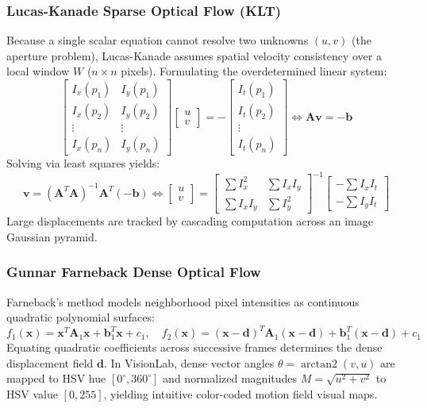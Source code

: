 \subsubsection{Lucas-Kanade Sparse Optical Flow (KLT)}
Because a single scalar equation cannot resolve two unknowns $(u,v)$ (the aperture problem), Lucas-Kanade assumes spatial velocity consistency over a local window $W$ ($n \times n$ pixels). Formulating the overdetermined linear system:
\begin{equation}
    \begin{bmatrix} I_x(p_1) & I_y(p_1) \\ I_x(p_2) & I_y(p_2) \\ \vdots & \vdots \\ I_x(p_n) & I_y(p_n) \end{bmatrix} \begin{bmatrix} u \\ v \end{bmatrix} = - \begin{bmatrix} I_t(p_1) \\ I_t(p_2) \\ \vdots \\ I_t(p_n) \end{bmatrix} \iff \mathbf{A} \mathbf{v} = -\mathbf{b}
\end{equation}
Solving via least squares yields:
\begin{equation}
    \mathbf{v} = \left(\mathbf{A}^T \mathbf{A}\right)^{-1} \mathbf{A}^T (-\mathbf{b}) \iff \begin{bmatrix} u \\ v \end{bmatrix} = \begin{bmatrix} \sum I_x^2 & \sum I_x I_y \\ \sum I_x I_y & \sum I_y^2 \end{bmatrix}^{-1} \begin{bmatrix} -\sum I_x I_t \\ -\sum I_y I_t \end{bmatrix}
\end{equation}
Large displacements are tracked by cascading computation across an image Gaussian pyramid.

\subsubsection{Gunnar Farneback Dense Optical Flow}
Farneback's method models neighborhood pixel intensities as continuous quadratic polynomial surfaces:
\begin{equation}
    f_1(\mathbf{x}) = \mathbf{x}^T \mathbf{A}_1 \mathbf{x} + \mathbf{b}_1^T \mathbf{x} + c_1, \quad f_2(\mathbf{x}) = (\mathbf{x} - \mathbf{d})^T \mathbf{A}_1 (\mathbf{x} - \mathbf{d}) + \mathbf{b}_1^T (\mathbf{x} - \mathbf{d}) + c_1
\end{equation}
Equating quadratic coefficients across successive frames determines the dense displacement field $\mathbf{d}$. In VisionLab, dense vector angles $\theta = \operatorname{arctan2}(v, u)$ are mapped to HSV hue $[0^\circ, 360^\circ]$ and normalized magnitudes $M = \sqrt{u^2 + v^2}$ to HSV value $[0, 255]$, yielding intuitive color-coded motion field visual maps.

